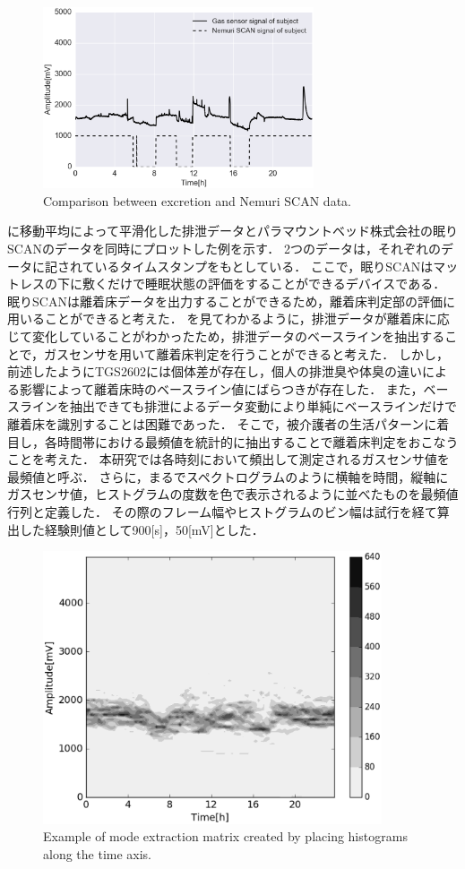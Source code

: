\begin{figure}[t]
\centering
\includegraphics[width=8cm]{./fig/inout3.eps}
\caption{Comparison between excretion and Nemuri SCAN data.}
\label{inout3}
\end{figure}

に移動平均によって平滑化した排泄データとパラマウントベッド株式会社の眠りSCANのデータを同時にプロットした例を示す．
2つのデータは，それぞれのデータに記されているタイムスタンプをもとしている．
ここで，眠りSCANはマットレスの下に敷くだけで睡眠状態の評価をすることができるデバイスである．
眠りSCANは離着床データを出力することができるため，離着床判定部の評価に用いることができると考えた．
を見てわかるように，排泄データが離着床に応じて変化していることがわかったため，排泄データのベースラインを抽出することで，ガスセンサを用いて離着床判定を行うことができると考えた．
しかし，前述したようにTGS2602には個体差が存在し，個人の排泄臭や体臭の違いによる影響によって離着床時のベースライン値にばらつきが存在した．
また，ベースラインを抽出できても排泄によるデータ変動により単純にベースラインだけで離着床を識別することは困難であった．
そこで，被介護者の生活パターンに着目し，各時間帯における最頻値を統計的に抽出することで離着床判定をおこなうことを考えた．
本研究では各時刻において頻出して測定されるガスセンサ値を最頻値と呼ぶ．
さらに，まるでスペクトログラムのように横軸を時間，縦軸にガスセンサ値，ヒストグラムの度数を色で表示されるように並べたものを最頻値行列と定義した．
その際のフレーム幅やヒストグラムのビン幅は試行を経て算出した経験則値として900[s]，50[mV]とした．


\begin{figure}[t]
\centering
\includegraphics[width=10cm]{./fig/C_matrix.eps}
\caption{Example of mode extraction matrix created by placing histograms along the time axis.}
\label{hist-spectrogram}
\end{figure}

